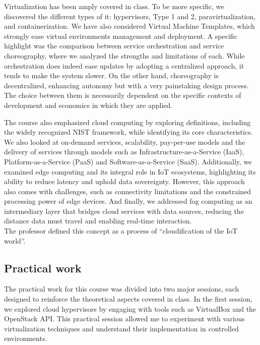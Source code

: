 \indent \indent Virtualization has been amply covered in class. To be more specific, we discovered the different types of it: hypervisors, Type 1 and 2, paravirtualization, and containerization. We have also considered Virtual Machine Templates, which strongly ease virtual environments management and deployment. A specific highlight was the comparison between service orchestration and service choreography, where we analyzed the strengths and limitations of each. While orchestration does indeed ease updates by adopting a centralized approach, it tends to make the system slower. On the other hand, choreography is decentralized, enhancing autonomy but with a very painstaking design process. The choice between them is necessarily dependent on the specific contexts of development and economics in which they are applied.\\
\vspace{0.25cm}

The course also emphasized cloud computing by exploring definitions, including the widely recognized NIST framework, while identifying its core characteristics. We also looked at on-demand services, scalability, pay-per-use models and the delivery of services through models such as Infrastructure-as-a-Service (IaaS), Platform-as-a-Service (PaaS) and Software-as-a-Service (SaaS). 
Additionally, we examined edge computing and its integral role in IoT ecosystems, highlighting its ability to reduce latency and uphold data sovereignty. However, this approach also comes with challenges, such as connectivity limitations and the constrained processing power of edge devices. And finally, we addressed fog computing as an intermediary layer that bridges cloud services with data sources, reducing the distance data must travel and enabling real-time interaction. \\
The professor defined this concept as a process of “cloudification of the IoT world”.

\subsection{Practical work}
\indent \indent The practical work for this course was divided into two major sessions, each designed to reinforce the theoretical aspects covered in class. In the first session, we explored cloud hypervisors by engaging with tools such as VirtualBox and the OpenStack API. This practical session allowed me to experiment with various virtualization techniques and understand their implementation in controlled environments.
\vspace{0.25cm}

